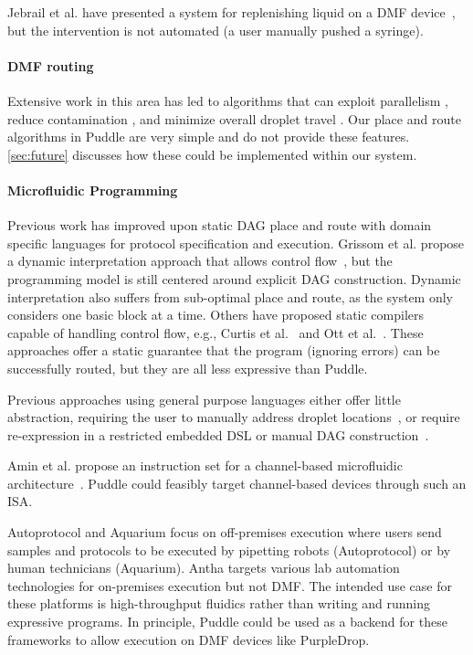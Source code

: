 \documentclass[sigconf, screen]{acmart}
\begin{document}
Jebrail et al. have presented a system for replenishing liquid on a DMF device~\cite{jebrail2015solvent}, but the intervention is not automated (a user manually pushed a syringe).

\paragraph{DMF routing}

Extensive work in this area has led to algorithms that can
exploit parallelism \cite{bohringer2006parallel, grissom2012scheduling},
reduce contamination \cite{yao2016contamination, zhao2012contamination, huang2010contamination},
and minimize overall droplet travel \cite{keszocze2015routing, roy2010routing}.
Our place and route algorithms in Puddle are very simple and do not provide these features.
\autoref{sec:future} discusses how these could be implemented within our system.

\paragraph{Microfluidic Programming}
Previous work has improved upon static DAG place and route with domain specific languages for protocol specification and execution.
Grissom et al. propose a dynamic interpretation approach that allows control flow~\cite{grissom2014interpreting}, but the programming model is still centered around explicit DAG construction.
Dynamic interpretation also suffers from sub-optimal place and route, as the system only considers one basic block at a time.
Others have proposed static compilers capable of handling control flow, e.g., Curtis et al.~\cite{curtis2018compiler} and Ott et al.~\cite{ott2018bioscript}.
These approaches offer a static guarantee that the program (ignoring errors) can be successfully routed, but they are all less expressive than Puddle.

Previous approaches using general purpose languages either offer little abstraction, requiring the user to manually address droplet locations~\cite{opendrop, dropbot}, or require re-expression in a restricted embedded DSL or manual DAG construction~\cite{curtis2018compiler, biocoder}.

Amin et al. propose an instruction set for a channel-based microfluidic architecture~\cite{amin2007aquacore}.
Puddle could feasibly target channel-based devices through such an ISA.

Autoprotocol \cite{autoprotocol} and Aquarium \cite{aquarium} focus on off-premises execution where users send samples and protocols to be executed by pipetting robots (Autoprotocol) or by human technicians (Aquarium).
Antha \cite{antha} targets various lab automation technologies for on-premises execution but not DMF.
The intended use case for these platforms is high-throughput fluidics rather than writing and running expressive programs.
In principle, Puddle could be used as a backend for these frameworks to allow execution on DMF devices like PurpleDrop.
\end{document}
